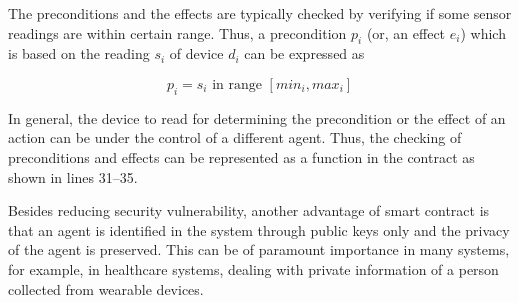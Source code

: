 The preconditions and the effects are typically checked by verifying if some sensor readings are within certain range. Thus,
a precondition $p_i$ (or, an effect $e_i$) which is based on the reading $s_i$ of device $d_i$ can be expressed as

\begin{equation}
	p_i = s_i  \text{ in range } [ min_i, max_i]
\end{equation}

\noindent
In general, the device to read for determining the precondition or the effect of an action can be under the control of a
different agent. Thus, the checking of preconditions and effects can be represented as a function in the contract as shown
in lines 31--35. 

Besides reducing security vulnerability, another advantage of smart contract is that an agent is identified in the system through 
public keys only and the privacy of the agent is preserved. This can be of paramount importance in many systems, for example, in 
healthcare systems, dealing with private information of a person collected from wearable devices.

